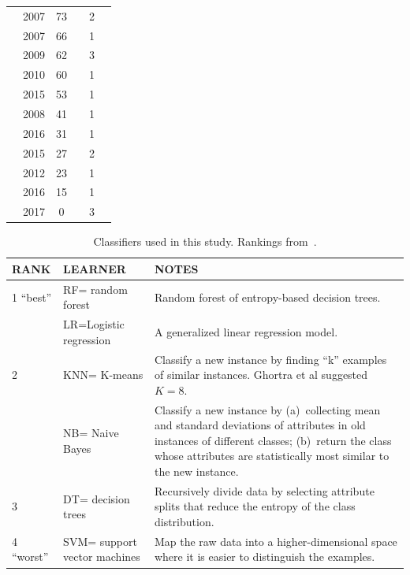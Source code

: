 \documentclass[sigconf,review, anonymous]{acmart}
\newcommand{\cmark}{\ding{51}}%
\newcommand{\xmark}{\ding{55}}%
\theoremstyle{break}
\theoremstyle{break}
\begin{document}
\begin{table}[!htbp]
\begin{tabular}{c|c|c|c|c|c}
        \cite{kamei2007effects} & 2007 & 73 & \xmark & 2 & \cmark\\  
        \cite{pelayo2007applying} & 2007 & 66 & \xmark & 1 & \cmark \\  
        \cite{jiang2009variance} & 2009 & 62 & \cmark & 3 & \xmark  \\ 
        \cite{khoshgoftaar2010attribute} & 2010 & 60 & \cmark & 1 & \cmark  \\  
        \cite{ghotra2015revisiting} & 2015 & 53 & \cmark & 1 & \xmark  \\  
        \cite{jiang2008can} & 2008 & 41 & \cmark & 1 & \xmark  \\  
         \cite{tantithamthavorn2016automated} & 2016 & 31 & \cmark & 1 & \xmark  \\ 
        \cite{tan2015online} & 2015 & 27 & \xmark & 2 & \cmark \\  
        \cite{pelayo2012evaluating} & 2012 & 23 & \xmark & 1 & \cmark \\  
        \cite{fu2016tuning} & 2016 & 15 & \cmark & 1 & \xmark  \\  
        \cite{bennin2017mahakil} & 2017 & 0 & \cmark & 3 & \cmark \\
\end{tabular}
\vspace{-0.3cm}
\end{table}
 \begin{table}[!t]
 \caption{Classifiers used in this study.
 Rankings
 from~\cite{ghotra2015revisiting}.}
 \vspace{-0.2cm}
 \label{tbl:learners}
 \footnotesize
 \begin{tabular}{l|l|p{4.5in}}
{\bf RANK} & {\bf LEARNER} & {\bf NOTES}\\\hline
 1 ``best'' & RF= random forest & 
 Random forest of entropy-based decision trees.\\\cline{2-3}
 &  LR=Logistic regression &
 A generalized linear regression
model.\\\hline
 2 & KNN= K-means &  Classify a new instance by finding ``k'' examples of similar instances.
 Ghortra et al suggested
 $K=8$.\\\cline{2-3}
 & NB= Naive Bayes &  Classify a new instance by (a)~collecting mean and standard deviations of attributes in old instances of  different classes; (b)~return the class whose attributes are statistically most similar to the new instance.\\\hline
 3 & DT= decision trees & Recursively
 divide data by selecting attribute splits
 that reduce the entropy of the class distribution.\\\hline

 4 ``worst'' & SVM= support vector machines &
 Map the raw data into a higher-dimensional space where it is easier to distinguish the examples.
 \\\hline
 \end{tabular}
 \end{table}
 
\end{document}
